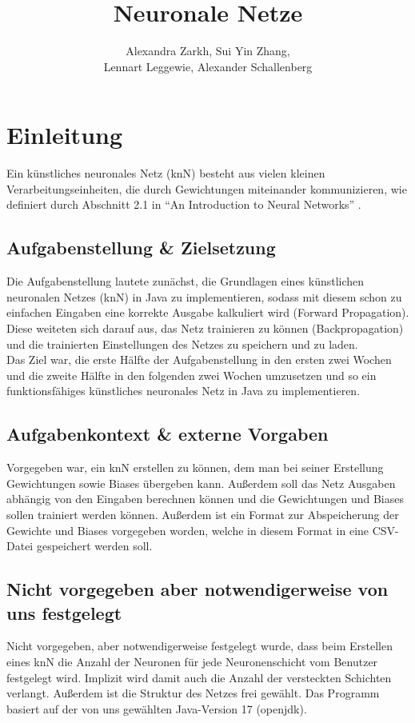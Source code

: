 \documentclass[paper=A4,pagesize=auto,12pt,headinclude=true,footinclude=true,BCOR=0mm,DIV=calc]{scrartcl}
\title{Neuronale Netze}
\author{Alexandra Zarkh, Sui Yin Zhang,\\ Lennart Leggewie, Alexander Schallenberg}
\begin{document}
\begin{titlepage}
	\maketitle
\end{titlepage}

\tableofcontents
\newpage



\section{Einleitung}
Ein künstliches neuronales Netz (knN) besteht aus vielen kleinen Verarbeitungseinheiten, die durch Gewichtungen miteinander kommunizieren, wie definiert durch Abschnitt 2.1 in “An Introduction to Neural Networks” \cite{script}.

\subsection{Aufgabenstellung \& Zielsetzung}
Die Aufgabenstellung lautete zunächst, die Grundlagen eines künstlichen neuronalen Netzes (knN) in Java zu implementieren, sodass mit diesem schon zu einfachen Eingaben eine korrekte Ausgabe kalkuliert wird (Forward Propagation). Diese weiteten sich darauf aus, das Netz trainieren zu können (Backpropagation) und die trainierten Einstellungen des Netzes zu speichern und zu laden.\\
Das Ziel war, die erste Hälfte der Aufgabenstellung in den ersten zwei Wochen und die zweite Hälfte in den folgenden zwei Wochen umzusetzen und so ein funktionsfähiges künstliches neuronales Netz in Java zu implementieren.

\subsection{Aufgabenkontext \& externe Vorgaben}
Vorgegeben war, ein knN erstellen zu können, dem man bei seiner Erstellung Gewichtungen sowie Biases übergeben kann. Außerdem soll das Netz Ausgaben abhängig von den Eingaben berechnen können und die Gewichtungen und Biases sollen trainiert werden können. Außerdem ist ein Format zur Abspeicherung der Gewichte und Biases vorgegeben worden, welche in diesem Format in eine CSV-Datei gespeichert werden soll.

\subsection{Nicht vorgegeben aber notwendigerweise von uns festgelegt}
Nicht vorgegeben, aber notwendigerweise festgelegt wurde, dass beim Erstellen eines knN die Anzahl der Neuronen für jede Neuronenschicht vom Benutzer festgelegt wird. Implizit wird damit auch die Anzahl der versteckten Schichten verlangt. Außerdem ist die Struktur des Netzes frei gewählt. Das Programm basiert auf der von uns gewählten Java-Version 17 (openjdk).
\end{document}
